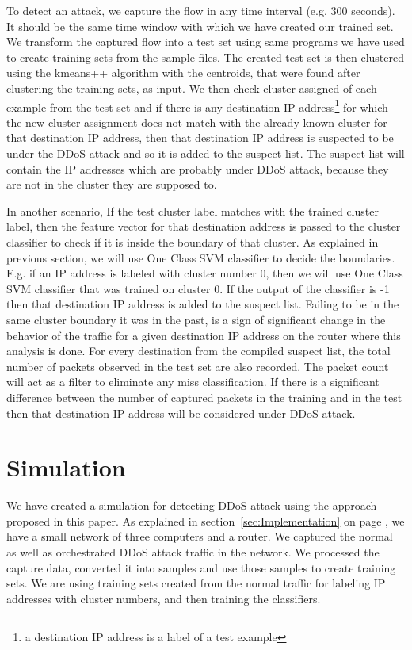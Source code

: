 \documentclass[12pt,oneside,a4paper]{article}
\begin{document}
To detect an attack, we capture the flow in any time interval (e.g. 300 seconds). It should be the same time window with which we have created our trained set. We transform the captured flow into a test set using same programs we have used to create training sets from the sample files. The created test set is then clustered using the kmeans++ algorithm with the centroids, that were found after clustering the training sets, as input. We then check cluster assigned of each example from the test set and if there is any destination IP address\footnote{a destination IP address is a label of a test example} for which the new cluster assignment does not match with the already known cluster for that destination IP address, then that destination IP address is suspected to be under the DDoS attack and so it is added to the suspect list. The suspect list will contain the IP addresses which are probably under DDoS attack, because they are not in the cluster they are supposed to.

In another scenario, If the test cluster label matches with the trained cluster label, then the feature vector for that destination address is passed to the cluster classifier to check if it is inside the boundary of that cluster. As explained in previous section, we will use One Class SVM classifier to decide the boundaries. E.g. if an IP address is labeled with cluster number 0, then we will use One Class SVM classifier that was trained on cluster 0. If the output of the classifier is -1 then that destination IP address is added to the suspect list. Failing to be in the same cluster boundary it was in the past, is a sign of significant change in the behavior of the traffic for a given destination IP address on the router where this analysis is done. For every destination from the compiled suspect list, the total number of packets observed in the test set are also recorded. The packet count will act as a filter to eliminate any miss classification. If there is a significant difference between the number of captured packets in the training and in the test then that destination IP address will be considered under DDoS attack.

\section{Simulation}

We have created a simulation for detecting DDoS attack using the approach proposed in this paper. As explained in section~\ref{sec:Implementation} on page \pageref{sec:Implementation}, we have a small network of three computers and a router. We captured the normal as well as orchestrated DDoS attack traffic in the network. We processed the capture data, converted it into samples and use those samples to create training sets. We are using training sets created from the normal traffic for labeling IP addresses with cluster numbers, and then training the classifiers.
\end{document}
